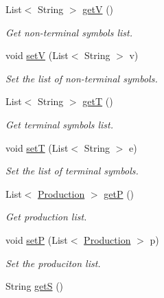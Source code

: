 \begin{DoxyCompactItemize}
\item 
List$<$ String $>$ \hyperlink{classcontext_free_1_1grammar_1_1_context_free_grammar_a664b69a446100c7c4e7a390fb2ee5ebc}{get\-V} ()
\begin{DoxyCompactList}\small\item\em Get non-\/terminal symbols list. \end{DoxyCompactList}\item 
void \hyperlink{classcontext_free_1_1grammar_1_1_context_free_grammar_ad3d3e1efadeb4cc6ed252342fd52c76c}{set\-V} (List$<$ String $>$ v)
\begin{DoxyCompactList}\small\item\em Set the list of non-\/terminal symbols. \end{DoxyCompactList}\item 
List$<$ String $>$ \hyperlink{classcontext_free_1_1grammar_1_1_context_free_grammar_a75f1bbf1e0d1d1350032c628779fcffd}{get\-T} ()
\begin{DoxyCompactList}\small\item\em Get terminal symbols list. \end{DoxyCompactList}\item 
void \hyperlink{classcontext_free_1_1grammar_1_1_context_free_grammar_aa1c9a277d660b2ba8443f47cb9543811}{set\-T} (List$<$ String $>$ e)
\begin{DoxyCompactList}\small\item\em Set the list of terminal symbols. \end{DoxyCompactList}\item 
List$<$ \hyperlink{classcontext_free_1_1grammar_1_1_production}{Production} $>$ \hyperlink{classcontext_free_1_1grammar_1_1_context_free_grammar_ad00a00b018844cf2acb0c1c5f5d97468}{get\-P} ()
\begin{DoxyCompactList}\small\item\em Get production list. \end{DoxyCompactList}\item 
void \hyperlink{classcontext_free_1_1grammar_1_1_context_free_grammar_a2a66695521702040224c23898b579c92}{set\-P} (List$<$ \hyperlink{classcontext_free_1_1grammar_1_1_production}{Production} $>$ p)
\begin{DoxyCompactList}\small\item\em Set the produciton list. \end{DoxyCompactList}\item 
String \hyperlink{classcontext_free_1_1grammar_1_1_context_free_grammar_ad278c4f5e2bdec1d011d11a3008d8754}{get\-S} ()

\end{DoxyCompactItemize}
